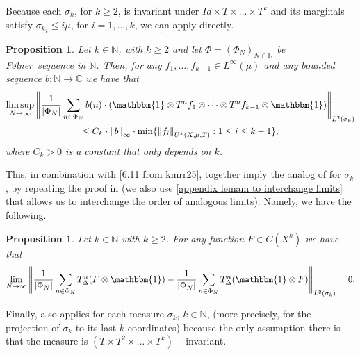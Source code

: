 \documentclass[letter, 11pt]{article}
\newcommand{\Folner}{F\o{}lner}
\newtheorem{prop}[theo]{Proposition}
\theoremstyle{definition}
\theoremstyle{plain}
\newcommand{\N}{\mathbb{N}}
\newcommand{\C}{\mathbb{C}}
\newcommand{\norm}[1]{\left\lVert#1\right\rVert}
\providecommand{\norm}[1]{\lVert #1\rVert}
\newcommand{\1}{\mathbbm{1}}
\begin{document}
Because each $\sigma_k$, for $k\geq 2$, is invariant under 
$Id\times T \times \dots \times T^k$ and its marginals satisfy 
${\sigma_k}_i \leq i \mu$, for $i=1,\ldots,k$, we can apply 
\cite[Theorem $6.6$]{kmrr25} directly. 

\begin{prop} \label{theorem 6.6 from kmrr}
Let $k\in \N$, with $k\geq 2$ and let $\Phi=(\Phi_N)_{N\in \N}$ be \Folner\ sequence in $\N$. Then, for any $f_1,\ldots,f_{k-1}\in L^{\infty}(\mu)$ and any bounded sequence $b:\N\to \C$ we have that 
\begin{multline*}
\limsup_{N\to \infty} \norm{\frac{1}{|\Phi_N|}\sum_{n\in \Phi_N} b(n) \cdot \left( \1 \otimes T^nf_1 \otimes \dots \otimes T^nf_{k-1} \otimes \1 \right)}_{L^2(\sigma_k)} \\
\leq C_k \cdot \norm{b}_{\infty} \cdot \min\{\norm{f_i}_{U^{k}(X,\mu,T)}: 1\leq i \leq k-1\},    
\end{multline*}
where $C_k>0$ is a constant that only depends on $k$.
\end{prop}

This, in combination with \cref{6.11 from kmrr25}, together imply the analog of \cite[Theorem $6.2$]{kmrr25} for $\sigma_k$, by repeating the proof in \cite[Section $6.4$]{kmrr25} (we also use \cref{appendix lemam to interchange limits} that allows us to interchange the order of analogous limits). Namely, we have the following. 

\begin{prop}\label{analogue of 6.2}
Let $k\in \N$ with $k\geq 2$. For any function $F\in C(X^k)$ we have that
$$ \lim_{N\to \infty} \norm{\frac{1}{|\Phi_N|}\sum_{n\in \Phi_N} T_{\Delta}^n(F\otimes \1) - \frac{1}{|\Phi_N|}\sum_{n\in \Phi_N} T_{\Delta}^n(\1\otimes F) }_{L^2(\sigma_k)} =0.$$
\end{prop}

Finally, \cite[Theorem $6.1$]{kmrr25} also applies for each measure 
$\sigma_k$, $k\in \N$, (more precisely, for the projection of $\sigma_k$ to
its last $k$-coordinates) because the only assumption there is that the 
measure is $(T\times T^2 \times \dots \times T^k)-$invariant. 
\end{document}
